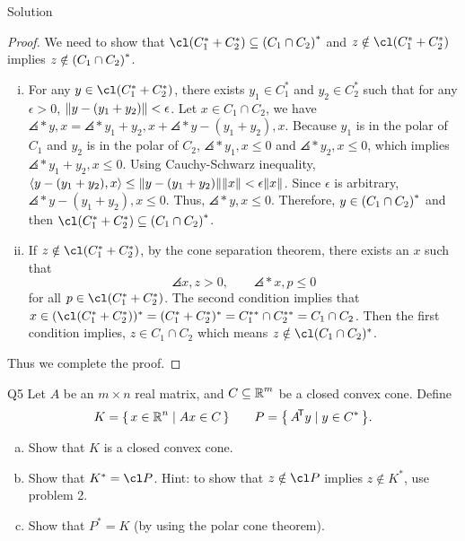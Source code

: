 \documentclass{article}
\begin{document}
\begin{solution}
    {Solution}
    \begin{proof}
        We need to show that $\cl \parens*{C_1^*+C_2^*} \subseteq \parens*{C_1\cap C_2}^*$ and $z\notin\cl(C_1^*+C_2^*)$ implies $z\notin \parens*{C_1\cap C_2}^*$.
        \begin{enumerate}[(i)]
            \item {
                For any $y\in \cl(C_1^*+C_2^*)$, there exists $y_1\in C_1^*$ and $y_2\in C_2^*$ such that for any $\epsilon>0$, $\norm{y-(y_1+y_2)}<\epsilon$. Let $x\in C_1\cap C_2$, we have $\angles*{y, x}=\angles*{y_1+y_2, x}+\angles*{y-(y_1+y_2), x}$. Because $y_1$ is in the polar of $C_1$ and $y_2$ is in the polar of $C_2$, $\angles*{y_1, x}\leq 0$ and $\angles*{y_2, x}\leq 0$, which implies $\angles*{y_1+y_2, x}\leq 0$. Using Cauchy-Schwarz inequality, $\angles*{y-(y_1+y_2), x}\leq \norm{y-(y_1+y_2)}\norm{x}<\epsilon\norm{x}$. Since $\epsilon$ is arbitrary, $\angles*{y-(y_1+y_2), x}\leq 0$. Thus, $\angles*{y, x}\leq 0$. Therefore, $y\in \parens*{C_1\cap C_2}^*$ and then $\cl(C_1^*+C_2^*)\subseteq \parens*{C_1\cap C_2}^*$.
            }
            \item {
                If $z\notin\cl(C_1^*+C_2^*)$, by the cone separation theorem, there exists an $x$ such that \[\angles{x,z}>0, \qquad \angles*{x,p}\leq 0\] for all $p\in \cl(C_1^*+C_2^*)$. The second condition implies that $x\in(\cl(C_1^*+C_2^*))^*=(C_1^*+C_2^*)^*=C_1^{**}\cap C_2^{**}=C_1\cap C_2$. Then the first condition implies, $z\in C_1\cap C_2$ which means $z\notin\cl(C_1\cap C_2)^*$.
            }
        \end{enumerate}
        Thus we complete the proof.
    \end{proof}
\end{solution}

\begin{problem}
    {Q5}
    Let $A$ be an $m\times n$ real matrix, and $C\subseteq \R^m$ be a closed convex cone. Define \[K=\set{x\in\R^n\mid Ax\in C} \qquad P=\set{A\trn y\mid y\in C^*}.\]
    \begin{enumerate}[(a)]
        \item Show that $K$ is a closed convex cone.
        \item Show that $K^*=\cl P$. Hint: to show that $z\notin \cl P$ implies $z\notin K^*$, use problem 2.
        \item Show that $P^*=K$ (by using the polar cone theorem).
    \end{enumerate}
\end{problem}
\end{document}
